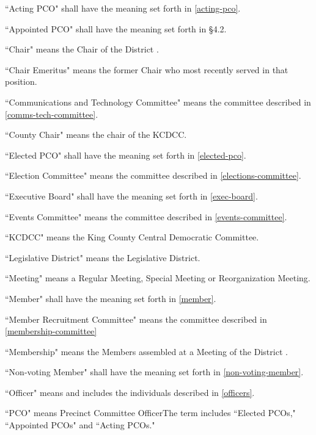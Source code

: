 \begin{alphalist}
    \item {}
    \item ``Acting PCO" shall have the meaning set forth in \autoref{acting-pco}.
    \item ``Appointed PCO" shall have the meaning set forth in \S 4.2.
    \item ``Chair" means the Chair of the \fortythird{} District .
    \item ``Chair Emeritus" means the former Chair who most recently served in that position.
    \item ``Communications and Technology Committee" means the committee described in \autoref{comms-tech-committee}.
    \item ``County Chair" means the chair of the KCDCC.
    \item ``Elected PCO" shall have the meaning set forth in \autoref{elected-pco}.
    \item ``Election Committee" means the committee described in \autoref{elections-committee}.
    \item ``Executive Board" shall have the meaning set forth in \autoref{exec-board}.
    \item ``Events Committee" means the committee described in \autoref{events-committee}.
    \item ``KCDCC" means the King County Central Democratic Committee.
    \item ``Legislative District" means the \fortythird{} Legislative District.
    \item ``Meeting" means a Regular Meeting, Special Meeting or Reorganization Meeting.
    \item ``Member" shall have the meaning set forth in \autoref{member}.
    \item ``Member Recruitment Committee" means the committee described in \autoref{membership-committee}
    \item ``Membership" means the Members assembled at a Meeting of the \fortythird{} District .
    \item ``Non-voting Member" shall have the meaning set forth in \autoref{non-voting-member}.
    \item ``Officer" means and includes the individuals described in \autoref{officers}.
    \item ``PCO" means Precinct Committee OfficerThe term includes ``Elected PCOs," ``Appointed PCOs" and ``Acting PCOs."

\end{alphalist}
